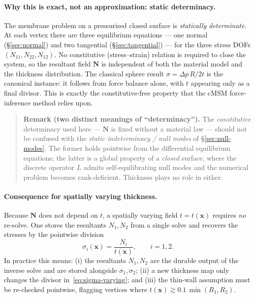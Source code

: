 \documentclass[11pt]{article}
\newcommand{\vv}[1]{\bm{#1}}          %
\newcommand{\Nb}{\mathbf{N}}           %
\begin{document}
\paragraph{Why this is exact, not an approximation: static determinacy.}
The membrane problem on a pressurised closed surface is \emph{statically
determinate}.  At each vertex there are three equilibrium equations — one normal
(\S\ref{sec:normal}) and two tangential (\S\ref{sec:tangential}) — for the three
stress DOFs $(N_{11},N_{22},N_{12})$.  No constitutive (stress--strain) relation
is required to close the system, so the resultant field $\Nb$ is independent of
both the material model and the thickness distribution.  The classical sphere
result $\sigma=\Delta p\,R/2t$ is the canonical instance: it follows from force
balance alone, with $t$ appearing only as a final divisor.  This is exactly the
constitutive-free property that the cMSM force-inference method relies upon.

\begin{quote}\small
\textbf{Remark (two distinct meanings of ``determinacy'').}  The
\emph{constitutive} determinacy used here — $\Nb$ is fixed without a material
law — should not be confused with the \emph{static indeterminacy / null modes}
of \S\ref{sec:null-modes}.  The former holds pointwise from the differential
equilibrium equations; the latter is a global property of a \emph{closed}
surface, where the discrete operator $L$ admits self-equilibrating null modes
and the numerical problem becomes rank-deficient.  Thickness plays no role in
either.
\end{quote}

\paragraph{Consequence for spatially varying thickness.}
Because $\Nb$ does not depend on $t$, a spatially varying field
$t=t(\vv{x})$ requires \emph{no} re-solve.  One stores the resultants
$N_1,N_2$ from a single solve and recovers the stresses by the pointwise
division
\begin{equation}
  \sigma_i(\vv{x}) = \frac{N_i}{t(\vv{x})}, \qquad i=1,2.
  \label{eq:sigma-varying}
\end{equation}
In practice this means: (i) the resultants $N_1,N_2$ are the durable output of
the inverse solve and are stored alongside $\sigma_1,\sigma_2$; (ii) a new
thickness map only changes the divisor in~\eqref{eq:sigma-varying}; and
(iii) the thin-wall assumption must be re-checked pointwise, flagging vertices
where $t(\vv{x})\gtrsim 0.1\,\min(R_1,R_2)$.
\end{document}
